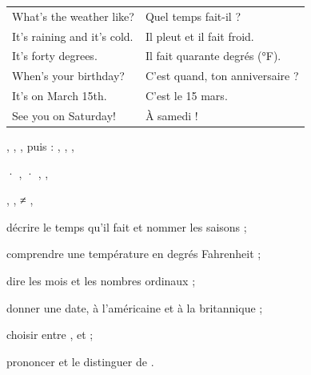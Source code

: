 \begin{essentiel}
\begin{minipage}[t]{0.54\linewidth}
\renewcommand{\arraystretch}{1.32}
\begin{tabular}{@{}>{\enOn\otSemi\fontsize{9.4}{11}\selectfont}l<{\enOff}@{\hspace{3mm}}>{\fontsize{9.2}{11}\selectfont\color{white!78!otNavy}}l@{}}
What's the weather like?   & Quel temps fait-il ?\\
It's raining and it's cold. & Il pleut et il fait froid.\\
It's forty degrees.        & Il fait quarante degrés (°F).\\
When's your birthday?      & C'est quand, ton anniversaire ?\\
It's on March 15th.        & C'est le 15 mars.\\
See you on Saturday!       & À samedi !\\
\end{tabular}
\end{minipage}\hfill
\begin{minipage}[t]{0.41\linewidth}
{\fontsize{9.2}{11.6}\selectfont {}, , , puis  : ,
, , \par}
{\fontsize{9.2}{11.6}\selectfont {} · ,  · ,
, \par}
{\fontsize{9.2}{11.6}\selectfont {}, ,   ≠ , 
\par}
\end{minipage}
\end{essentiel}

\begin{jesais}
\item décrire le temps qu'il fait et nommer les saisons ;
\item comprendre une température en degrés Fahrenheit ;
\item dire les mois et les nombres ordinaux ;
\item donner une date, à l'américaine et à la britannique ;
\item choisir entre ,  et  ;
\item prononcer  et le distinguer de .
\end{jesais}

